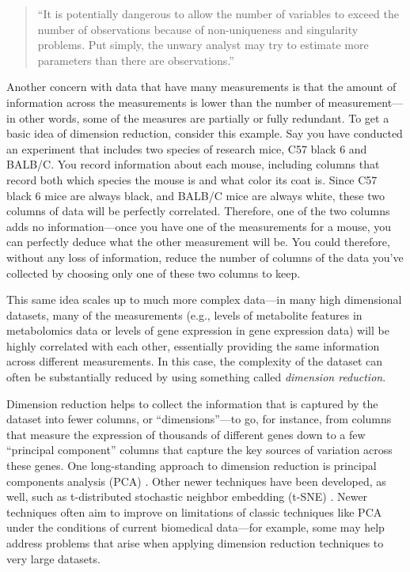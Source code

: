\documentclass[]{tufte-book}
\begin{document}
\begin{quote}
``It is potentially dangerous to allow the number of variables to exceed the
number of observations because of non-uniqueness and singularity problems. Put
simply, the unwary analyst may try to estimate more parameters than there are
observations.'' \citep{chatfield1995problem}
\end{quote}

Another concern with data that have many measurements is that
the amount of information across the measurements is lower than the number of
measurement---in other words, some of the measures are partially or fully
redundant. To get a basic idea of dimension reduction, consider this example.
Say you have conducted an experiment that includes two species of research mice,
C57 black 6 and BALB/C. You record information about each mouse, including
columns that record both which species the mouse is and what color its coat is.
Since C57 black 6 mice are always black, and BALB/C mice are always white, these
two columns of data will be perfectly correlated. Therefore, one of the two
columns adds no information---once you have one of the measurements for a mouse,
you can perfectly deduce what the other measurement will be. You could
therefore, without any loss of information, reduce the number of
columns of the data you've collected by choosing only one of these
two columns to keep.

This same idea scales up to much more complex data---in many high dimensional
datasets, many of the measurements (e.g., levels of metabolite features in
metabolomics data or levels of gene expression in gene expression data) will be
highly correlated with each other, essentially providing the same information
across different measurements. In this case, the complexity of the dataset can
often be substantially reduced by using something called \emph{dimension reduction}.

Dimension reduction helps to collect the information that is captured by the
dataset into fewer columns, or ``dimensions''---to go, for instance, from columns
that measure the expression of thousands of different genes down to a few
``principal component'' columns that capture the key sources of variation across
these genes. One long-standing approach to dimension reduction is principal
components analysis (PCA) \citep{haque2017practical}. Other newer techniques have
been developed, as well, such as t-distributed stochastic neighbor embedding
(t-SNE) \citep{perkel2017single}. Newer techniques often aim to improve on
limitations of classic techniques like PCA under the conditions of current
biomedical data---for example, some may help address problems that arise when
applying dimension reduction techniques to very large datasets.
\end{document}
